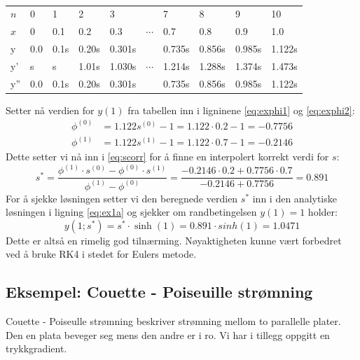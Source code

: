 \begin{table}[H]
  \centering
  \caption{}
  \label{tab:ex1beregn}
  \begin{tabularx}{1.0\textwidth}{X|XXXXXXXXX}
    \toprule
    $n$ & 0   & 1    & 2      & 3      &          & 7      & 8     & 9     & 10    \\
    $x$ & 0   & 0.1  & 0.2    & 0.3    & $\cdots$ & 0.7    & 0.8   & 0.9   & 1.0   \\
    \midrule
    y   & 0.0 & 0.1s & 0.20s  & 0.301s &          & 0.735s & 0.856s & 0.985s & 1.122s \\
    y'  & s   & s    & 1.01s  & 1.030s & $\cdots$ & 1.214s & 1.288s & 1.374s & 1.473s \\
    y'' & 0.0 & 0.1s & 0.20s  & 0.301s &          & 0.735s & 0.856s & 0.985s & 1.122s \\
    \bottomrule
  \end{tabularx}
\end{table}

\noindent Setter nå verdien for $y(1)$ fra tabellen inn i ligninene \eqref{eq:exphi1} og \eqref{eq:exphi2}:
\begin{align}
  \phi^{(0)} &= 1.122s^{(0)} - 1 = 1.122 \cdot 0.2 - 1 = -0.7756 \\
  \phi^{(1)} &= 1.122s^{(1)} - 1 = 1.122 \cdot 0.7 - 1 = -0.2146
\end{align}
Dette setter vi nå inn i \eqref{eq:scorr} for å finne en interpolert korrekt verdi for $s$:
\begin{equation}
  s^* = \dfrac{\phi^{(1)}\cdot s^{(0)} - \phi^{(0)}\cdot s^{(1)}}{\phi^{(1)} - \phi^{(0)}}
      = \frac{-0.2146 \cdot 0.2 + 0.7756 \cdot 0.7}{-0.2146+0.7756} = 0.891
\end{equation}
For å sjekke løsningen setter vi den beregnede verdien $s^*$ inn i den analytiske løsningen i ligning \eqref{eq:ex1a} og sjekker om randbetingelsen $y(1) = 1$ holder:
\begin{equation}
  y(1;s^*) = s^* \cdot \sinh(1) = 0.891 \cdot sinh(1) = 1.0471
\end{equation}
Dette er altså en rimelig god tilnærming. Nøyaktigheten kunne vært forbedret ved å bruke RK4 i stedet for Eulers metode.


\subsection{Eksempel: Couette - Poiseuille strømning} %
\label{sub:eksempel_couette_poiseuille_str_mning}
Couette - Poiseulle strømning beskriver strømning mellom to parallelle plater. Den en plata beveger seg mens den andre er i ro. Vi har i tillegg oppgitt en trykkgradient.

